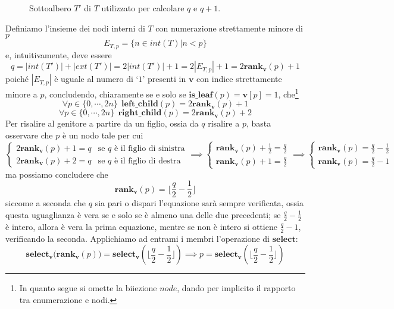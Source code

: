 \begin{figure}[h]
	\caption{Sottoalbero $T'$ di $T$ utilizzato per calcolare $q$ e $q+1$.}
	\label{fig:btree_rappr_step}
\end{figure}

Definiamo l'insieme dei nodi interni di $T$ con numerazione strettamente
minore di $p$
$$
	E_{T, p} = \{n \in int(T) | n < p \}
$$
e, intuitivamente, deve essere
$$
	q = |int(T')| + |ext(T')| = 2 |int(T')| + 1 = 2 |E_{T,p}| + 1 = 2 \mathbf{rank_v}(p) + 1
$$
poiché $|E_{T,p}|$ è uguale al numero di `$1$' presenti in $\mathbf{v}$ con indice
strettamente minore a $p$, concludendo, chiaramente se e solo se
$\mathbf{is\_leaf}(p) = \mathbf{v}[p] = 1$, che\footnote{In quanto segue si omette
	la biiezione $node$, dando per implicito il rapporto tra enumerazione e nodi.}
$$
	\forall p \in \{0, \cdots, 2n\} ~~ \mathbf{left\_child}(p) = 2 \mathbf{rank_v}(p) + 1
$$
$$
	\forall p \in \{0, \cdots, 2n\} ~~ \mathbf{right\_child}(p) = 2 \mathbf{rank_v}(p) + 2
$$
Per risalire al genitore a partire da un figlio, ossia da $q$ risalire a $p$,
basta osservare che $p$ è un nodo tale per cui
$$
	\begin{cases}
		2\mathbf{rank_v}(p) + 1 = q & \text{se } q \text{ è il figlio di sinistra} \\
		2\mathbf{rank_v}(p) + 2 = q & \text{se } q \text{ è il figlio di destra}
	\end{cases}
	\implies
	\begin{cases}
		\mathbf{rank_v}(p) + \frac{1}{2} = \frac{q}{2} \\
		\mathbf{rank_v}(p) + 1 = \frac{q}{2}
	\end{cases}
	\implies
	\begin{cases}
		\mathbf{rank_v}(p) = \frac{q}{2}  - \frac{1}{2} \\
		\mathbf{rank_v}(p) = \frac{q}{2} - 1
	\end{cases}
$$
ma possiamo concludere che
$$
	\mathbf{rank_v}(p) = \lfloor \frac{q}{2} - \frac{1}{2} \rfloor
$$
siccome a seconda che $q$ sia pari o dispari l'equazione sarà sempre verificata,
ossia questa uguaglianza è vera se e solo se è almeno una delle due precedenti;
se $\frac{q}{2} - \frac{1}{2}$ è intero, allora è vera la prima equazione, mentre
se non è intero si ottiene $\frac{q}{2} - 1$, verificando la seconda.
Applichiamo ad entrami i membri l'operazione di $\mathbf{select}$:
$$
	\mathbf{select_v(rank_v}(p)) = \mathbf{select_v}(\lfloor \frac{q}{2} - \frac{1}{2} \rfloor)
	\implies p = \mathbf{select_v}(\lfloor \frac{q}{2} - \frac{1}{2} \rfloor)
$$

